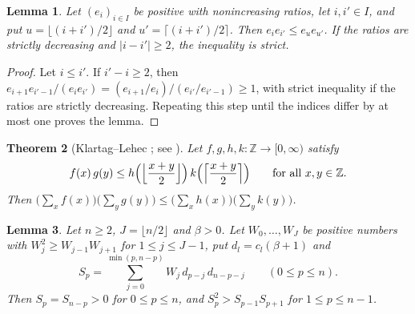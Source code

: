 \documentclass[11pt]{amsart}
\newtheorem{theorem}{Theorem}[section]
\newtheorem{lemma}[theorem]{Lemma}
\theoremstyle{definition}
\theoremstyle{remark}
\numberwithin{equation}{section}
\begin{document}
\begin{lemma}\label{lem:balance}
Let $(e_i)_{i\in I}$ be positive with nonincreasing ratios, let $i,i'\in I$, and put $u=\lfloor(i+i')/2\rfloor$ and $u'=\lceil(i+i')/2\rceil$. Then $e_ie_{i'}\le e_ue_{u'}$. If the ratios are strictly decreasing and $|i-i'|\ge2$, the inequality is strict.
\end{lemma}

\begin{proof}
Let $i\le i'$. If $i'-i\ge2$, then $e_{i+1}e_{i'-1}/(e_ie_{i'})=(e_{i+1}/e_i)/(e_{i'}/e_{i'-1})\ge1$, with strict inequality if the ratios are strictly decreasing. Repeating this step until the indices differ by at most one proves the lemma.
\end{proof}

\begin{theorem}[Klartag--Lehec {\cite{KL19}}; see {\cite[arXiv:1905.04038v1, Theorem~3]{GRST19}}]\label{thm:KL}
Let $f,g,h,k\colon\mathbb{Z}\to[0,\infty)$ satisfy
\[
f(x)\,g(y)\le h\Bigl(\Bigl\lfloor\frac{x+y}{2}\Bigr\rfloor\Bigr)\,k\Bigl(\Bigl\lceil\frac{x+y}{2}\Bigr\rceil\Bigr)\qquad\text{for all }x,y\in\mathbb{Z}.
\]
Then $\bigl(\sum_xf(x)\bigr)\bigl(\sum_yg(y)\bigr)\le\bigl(\sum_xh(x)\bigr)\bigl(\sum_yk(y)\bigr)$.
\end{theorem}

\begin{lemma}\label{lem:transfer}
Let $n\ge2$, $J=\lfloor n/2\rfloor$ and $\beta>0$. Let $W_0,\dots,W_J$ be positive numbers with $W_j^2\ge W_{j-1}W_{j+1}$ for $1\le j\le J-1$, put $d_l=c_l(\beta+1)$ and
\[
S_p=\sum_{j=0}^{\min(p,n-p)}W_j\,d_{p-j}\,d_{n-p-j}\qquad(0\le p\le n).
\]
Then $S_p=S_{n-p}>0$ for $0\le p\le n$, and $S_p^2>S_{p-1}S_{p+1}$ for $1\le p\le n-1$.
\end{lemma}
\end{document}

